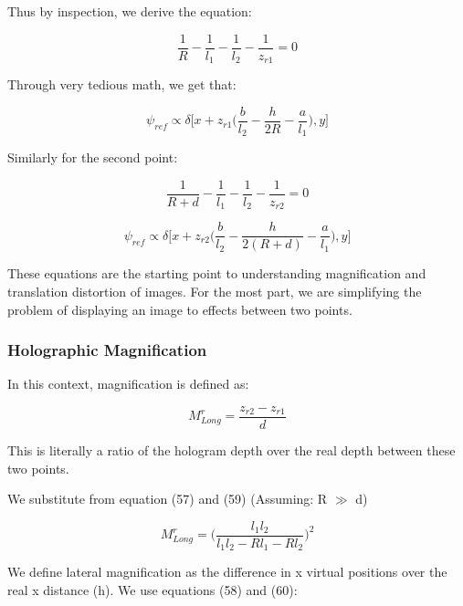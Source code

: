 \documentclass[12pt]{article}
\begin{document}
Thus by inspection, we derive the equation:

\begin{equation}
	\frac{1}{R} - \frac{1}{l_{1}} - \frac{1}{l_{2}} - \frac{1}{z_{r1}} = 0
\end{equation}

Through very tedious math, we get that:

\begin{equation}
	\psi_{ref} \propto \delta \bigg[ x + z_{r1}\bigg( 
	\frac{b}{l_{2}} - \frac{h}{2R} - \frac{a}{l_{1}}\bigg),y\bigg]
\end{equation}

Similarly for the second point:

\begin{equation}
	\frac{1}{R + d} - \frac{1}{l_{1}} - \frac{1}{l_{2}} - \frac{1}{z_{r2}} = 0
\end{equation}

\begin{equation}
        \psi_{ref} \propto \delta \bigg[ x + z_{r2}\bigg(
        \frac{b}{l_{2}} - \frac{h}{2(R + d)} - \frac{a}{l_{1}}\bigg),y\bigg]
\end{equation}

These equations are the starting point to understanding magnification and translation distortion of images.
For the most part, we are simplifying the problem of displaying an image to 
effects between two points.

\subsubsection{Holographic Magnification}

In this context, magnification is defined as:

\begin{equation}
	M_{Long}^r = \frac{z_{r2} - z_{r1}}{d}
\end{equation}

This is literally a ratio of the hologram depth over the real depth between these two points.

We substitute from equation (57) and (59) (Assuming: R \(\gg\) d)

\begin{equation}
	M_{Long}^r = \bigg(\frac{l_{1}l_{2}}{l_{1}l_{2} - Rl_{1} - Rl_{2}}\bigg)^2
\end{equation}

We define lateral magnification as the difference in x virtual positions over the real x distance (h). We use equations (58) and (60):
\end{document}
